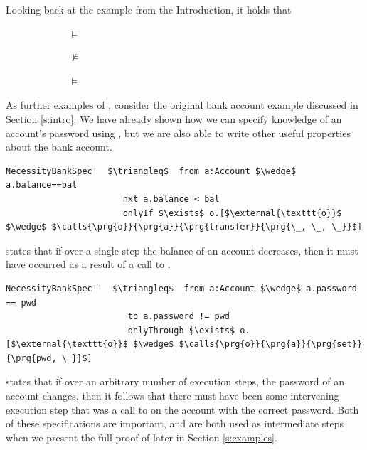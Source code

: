 Looking back at the example from the Introduction,   it holds that
\\
\strut $\hspace{1in}$  $\models$ 
 \\
\strut $\hspace{1in}$  $\not\models$ 
 \\
\strut $\hspace{1in}$  $\models$ 
 

 
As further examples of \NecessitySpecifications, consider the original 
bank account example discussed in Section \ref{s:intro}. We have already shown
how we can specify knowledge of an account's password using ,
but we are also able to write other useful properties about the bank account. 
 
\begin{lstlisting}[language = Chainmail, mathescape=true, frame=lines]
NecessityBankSpec'  $\triangleq$  from a:Account $\wedge$ a.balance==bal
                       nxt a.balance < bal
                       onlyIf $\exists$ o.[$\external{\texttt{o}}$ $\wedge$ $\calls{\prg{o}}{\prg{a}}{\prg{transfer}}{\prg{\_, \_, \_}}$]
\end{lstlisting}
 
 states that if over a single step the balance of an account decreases, then it must have occurred as 
a result of a call to .
 
\begin{lstlisting}[language = Chainmail, mathescape=true, frame=lines]
NecessityBankSpec''  $\triangleq$  from a:Account $\wedge$ a.password == pwd
                        to a.password != pwd
                        onlyThrough $\exists$ o.[$\external{\texttt{o}}$ $\wedge$ $\calls{\prg{o}}{\prg{a}}{\prg{set}}{\prg{pwd, \_}}$]
\end{lstlisting}
 
 states that if over an arbitrary number of execution steps, the password of an account changes,
then it follows that there must have been some intervening execution step that was a call to  on the account 
with the correct password. Both of these specifications are important, and are both used as intermediate steps
when we present the full proof of  later in Section \ref{s:examples}.


